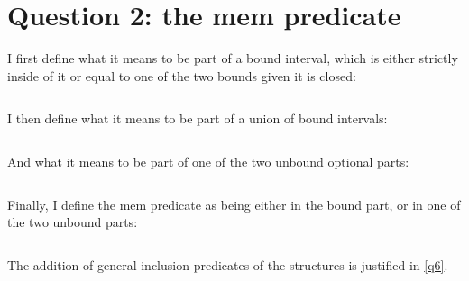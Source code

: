 \section{Question 2: the mem predicate}

I first define what it means to be part of a bound interval, which is either strictly
inside of it or equal to one of the two bounds given it is closed:

\inputminted{\whyml}{why3code/mem_interval.mlw}

I then define what it means to be part of a union of bound intervals:
\inputminted{\whyml}{why3code/mem_union.mlw}
And what it means to be part of one of the two unbound optional parts:
\inputminted{\whyml}{why3code/mem_unbound.mlw}

Finally, I define the mem predicate as being either in the bound part, or in one of
the two unbound parts:
\inputminted{\whyml}{why3code/mem.mlw}

The addition of general inclusion predicates of the structures is justified in
\autoref{q6}.
